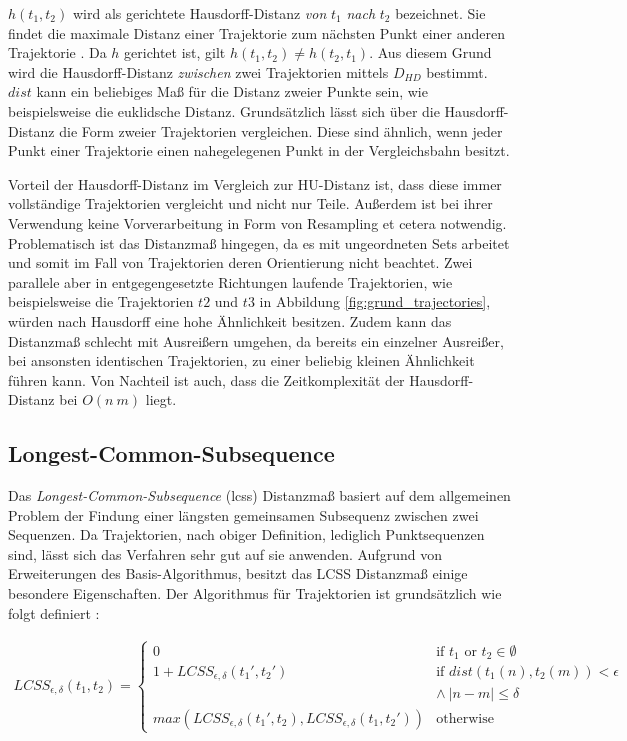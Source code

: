 $h(t_1, t_2)$ wird als gerichtete Hausdorff-Distanz \textit{von} $t_1$ \textit{nach} $t_2$ bezeichnet.
Sie findet die maximale Distanz einer Trajektorie zum nächsten Punkt einer anderen Trajektorie \cite[]{Huttenlocher}.
Da $h$ gerichtet ist, gilt $h(t_1, t_2) \neq h(t_2, t_1)$. Aus diesem Grund wird die Hausdorff-Distanz
\textit{zwischen} zwei Trajektorien mittels $D_{HD}$ bestimmt. $dist$ kann ein beliebiges Maß für die Distanz zweier
Punkte sein, wie beispielsweise die euklidsche Distanz.
Grundsätzlich lässt sich über die Hausdorff-Distanz die Form zweier Trajektorien vergleichen. Diese sind ähnlich,
wenn jeder Punkt einer Trajektorie einen nahegelegenen Punkt in der Vergleichsbahn besitzt.

Vorteil der Hausdorff-Distanz im Vergleich zur HU-Distanz ist, dass diese immer vollständige Trajektorien vergleicht
und nicht nur Teile. Außerdem ist bei ihrer Verwendung keine Vorverarbeitung in Form von Resampling et cetera notwendig.
Problematisch ist das Distanzmaß hingegen, da es mit ungeordneten Sets arbeitet und somit im Fall von Trajektorien deren
Orientierung nicht beachtet. Zwei parallele aber in entgegengesetzte Richtungen laufende Trajektorien, wie beispielsweise
die Trajektorien $t2$ und $t3$ in Abbildung \ref{fig:grund_trajectories}, würden nach Hausdorff eine hohe Ähnlichkeit besitzen.
Zudem kann das Distanzmaß schlecht mit Ausreißern umgehen, da bereits ein einzelner Ausreißer, bei ansonsten identischen
Trajektorien, zu einer beliebig kleinen Ähnlichkeit führen kann.
Von Nachteil ist auch, dass die Zeitkomplexität der Hausdorff-Distanz bei $O(n\ m)$ liegt.

\subsection{Longest-Common-Subsequence}
\label{sec:lcss_distance}

Das \textit{Longest-Common-Subsequence} (\acrshort*{lcss}) Distanzmaß basiert auf dem allgemeinen Problem der Findung
einer längsten gemeinsamen Subsequenz zwischen zwei Sequenzen. Da Trajektorien, nach obiger Definition, lediglich Punktsequenzen sind,
lässt sich das Verfahren sehr gut auf sie anwenden. Aufgrund von Erweiterungen des Basis-Algorithmus, besitzt
das LCSS Distanzmaß einige besondere Eigenschaften. Der Algorithmus für Trajektorien ist grundsätzlich
wie folgt definiert \cite[]{Vlachos2002}:

\begin{ceqn}
\begin{align}
\label{eq_lcss}
    LCSS_{\epsilon, \delta}(t_1, t_2) =
    \begin{cases}
        0 & \text{if } t_1 \text{ or } t_2 \in \emptyset \\
        1 + LCSS_{\epsilon, \delta}(t_1', t_2') & \text{if } dist(t_1(n), t_2(m)) < \epsilon \\
        & \land\ |n - m| \leq \delta \\
        max(LCSS_{\epsilon, \delta}(t_1', t_2), LCSS_{\epsilon, \delta}(t_1, t_2')) & \text{otherwise}
    \end{cases}
\end{align}
\end{ceqn}

